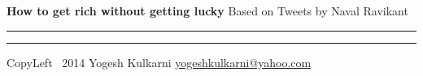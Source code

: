 % 


\usepackage{beamerarticle} %



\begin{center}
     \Large{\textbf{How to get rich without getting lucky} \small{Based on Tweets by Naval Ravikant}}  %
\end{center}
\rule{\linewidth}{0.25pt}
\raggedright
\footnotesize
\begin{multicols}{3}




\rule{0.3\linewidth}{0.25pt}

\scriptsize
CopyLeft \textcopyleft\ 2014 Yogesh Kulkarni
\href{http://www.yogeshkulkarni.com}{yogeshkulkarni@yahoo.com}

\end{multicols}

